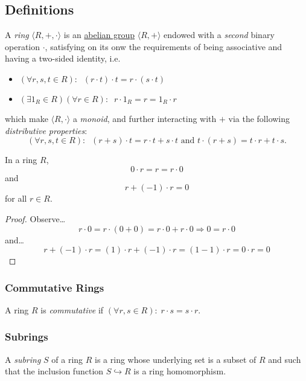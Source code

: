 \subsection{Definitions}\label{ringdefinition}
A \emph{ring} $\langle R, +, \cdot \rangle$ is an \hyperref[abeliangroupdefinition]{abelian group} $\langle R,+ \rangle$ endowed with a \emph{second}
binary operation $\cdot$, satisfying on its onw the requirements of being associative and having a two-sided identity, i.e.
\begin{itemize}
  \item $(\forall r,s,t \in R): \; \; (r \cdot t) \cdot t = r \cdot (s \cdot t)$
  \item $(\exists 1_R \in R) (\forall r \in R): \; \; r \cdot 1_R = r = 1_R \cdot r$
\end{itemize}
which make $\langle R, \cdot \rangle$ a \emph{monoid}, and further interacting with $+$ via the following \emph{distributive properties}:
$$(\forall r,s,t \in R): \; \; (r+s)\cdot t = r \cdot t + s \cdot t \textrm{ and } t \cdot (r + s) = t \cdot r + t \cdot s.$$

\begin{lemma}
In a ring $R$,
$$0 \cdot r = r = r \cdot 0$$
and
$$r + (-1) \cdot r = 0$$
for all $r \in R.$
\end{lemma}

\begin{proof}
Observe\dots
$$r \cdot 0 = r \cdot (0 + 0) = r \cdot 0 + r \cdot 0 \Rightarrow 0 = r \cdot 0$$
and\dots
$$r + (-1) \cdot r = (1) \cdot r + (-1) \cdot r = (1 - 1) \cdot r = 0 \cdot r = 0$$
\end{proof}

\subsubsection{Commutative Rings}\label{commutativeringdefinition}
A ring $R$ is \emph{commutative} if $(\forall r,s \in R): \; r \cdot s = s \cdot r$.

\subsubsection{Subrings}\label{subrings}
A \emph{subring} $S$ of a ring $R$ is a ring whose underlying set is a subset of $R$ and such that
the inclusion function $S \hookrightarrow R$ is a ring homomorphism.